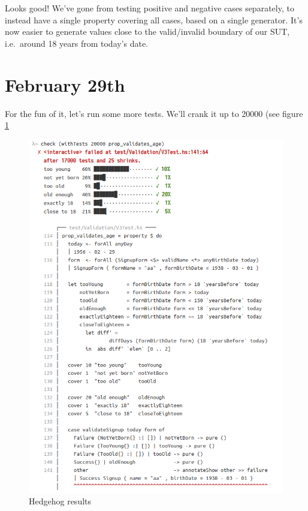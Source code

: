 \noindent Looks good! We've gone from testing positive and negative cases
separately, to instead have a single property covering all cases, based
on a single generator. It's now easier to generate values close to the
valid/invalid boundary of our SUT, i.e.~around 18 years from today's
date.

\section{February 29th}\label{february-29th}

For the fun of it, let's run some more tests. We'll crank it up to
20000 (see figure \ref{fig:hedgehog6}
\begin{figure}[htbp]
 \centering
 \includegraphics[width=\linewidth]{./pics/hedgehog6.png}
 \caption{Hedgehog results}
 \label{fig:hedgehog6}
\end{figure}


